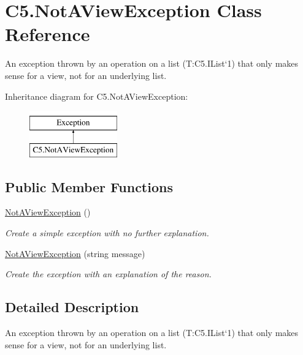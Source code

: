 \hypertarget{class_c5_1_1_not_a_view_exception}{}\section{C5.\+Not\+A\+View\+Exception Class Reference}
\label{class_c5_1_1_not_a_view_exception}


An exception thrown by an operation on a list (T\+:\+C5.\+I\+List`1) that only makes sense for a view, not for an underlying list.  


Inheritance diagram for C5.\+Not\+A\+View\+Exception\+:\begin{figure}[H]
\begin{center}
\leavevmode
\includegraphics[height=2.000000cm]{class_c5_1_1_not_a_view_exception}
\end{center}
\end{figure}
\subsection*{Public Member Functions}
\begin{DoxyCompactItemize}
\item 
\hyperlink{class_c5_1_1_not_a_view_exception_a0dc3e6647ff37c6797af1906de06a715}{Not\+A\+View\+Exception} ()
\begin{DoxyCompactList}\small\item\em Create a simple exception with no further explanation. \end{DoxyCompactList}\item 
\hyperlink{class_c5_1_1_not_a_view_exception_a1bfa94e339792196ecf0dcfc0ba3d3d2}{Not\+A\+View\+Exception} (string message)
\begin{DoxyCompactList}\small\item\em Create the exception with an explanation of the reason. \end{DoxyCompactList}\end{DoxyCompactItemize}


\subsection{Detailed Description}
An exception thrown by an operation on a list (T\+:\+C5.\+I\+List`1) that only makes sense for a view, not for an underlying list. 



